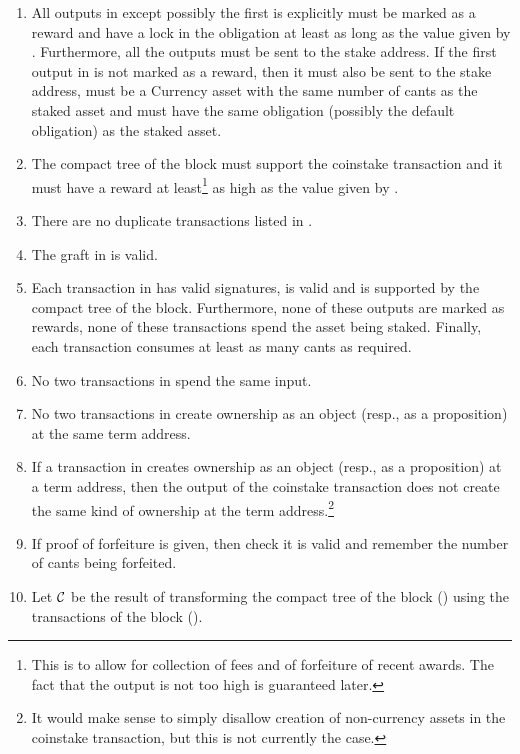 \begin{itemize}
\begin{enumerate}
\item All outputs in {} except possibly the first is explicitly must be marked as a reward
and
have a lock in the obligation at least as long as the value given by {}.
Furthermore, all the outputs must be sent to the stake address.
If the first output in {} is not marked as a reward, then it must also
be sent to the stake address, must be a Currency asset with the same number of cants as the staked asset
and must have the same obligation (possibly the default {} obligation) as the staked asset.
\item The compact tree of the block must support the coinstake transaction
and it must have a reward at least\footnote{This is to allow for collection of fees and of forfeiture of recent awards. The fact that the output is not too high is guaranteed later.}
as high as the value given by {}.
\item There are no duplicate transactions listed in {}.
\item The graft in {} is valid.
\item Each transaction in {} has valid signatures, is valid and is supported by the compact tree of the block. Furthermore, none of these outputs are marked as rewards, none of these transactions spend the asset being staked. Finally, each transaction consumes at least as many cants as required.
\item No two transactions in {} spend the same input.
\item No two transactions in {} create ownership as an object (resp., as a proposition) at the same term address.
\item If a transaction in {} creates ownership as an object (resp., as a proposition)
at a term address, then the output of the coinstake transaction does not create the same kind of ownership at the term address.\footnote{It would make sense to simply disallow creation of non-currency assets in the coinstake transaction, but this is not currently the case.}
\item If proof of forfeiture is given, then check it is valid and remember the number of cants being forfeited.
\item Let $\mathcal{C}$ be the result of transforming the compact tree of the block ({})
using the transactions of the block ({}).

\end{enumerate}
\end{itemize}
